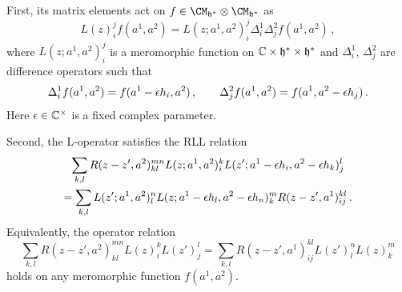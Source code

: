 First, its matrix elements act on
$f \in \CM_{\hf^*} \otimes \CM_{\hf^*}$ as
\begin{equation}
  L(z)^j_i f(a^1,a^2)
  = L(z;a^1,a^2)^j_i \Delta_i^1 \Delta_j^2 f(a^1,a^2) \,,
\end{equation}
where $L(z;a^1,a^2)^j_i$ is a meromorphic function on
$\mathbb{C} \times \mathfrak{h}^* \times \mathfrak{h}^*$ and $\Delta_i^1$,
$\Delta_j^2$ are difference operators such that
\begin{equation}
  \Delta_i^1 f(a^1,a^2)
  = f(a^1 - \epsilon h_i,a^2) \,,
  \qquad
  \Delta_j^2 f(a^1,a^2)
  = f(a^1, a^2 - \epsilon h_j) \,.
\end{equation}
Here $\epsilon\in\mathbb{C}^{\times}$ is a fixed complex parameter.

Second, the L-operator satisfies the RLL relation
\begin{multline}
  \label{eq:RLL}
  \sum_{k,l}
  R(z-z', a^2)^{mn}_{kl}
  L(z;a^1,a^2)^k_i
  L(z'; a^1 - \epsilon h_i, a^2 - \epsilon h_k)^l_j
  \\
  =
  \sum_{k,l}
  L(z';a^1,a^2)^n_l
  L(z; a^1 - \epsilon h_l, a^2 - \epsilon h_n)^m_k
  R(z-z', a^1)^{kl}_{ij} \,.
\end{multline}
Equivalently, the operator relation
\begin{equation}
  \sum_{k,l}
  R(z-z', a^2)^{mn}_{kl} L(z)^k_i L(z')^l_j
  =
  \sum_{k,l}
  R(z-z', a^1)^{kl}_{ij} L(z')^n_l L(z)^m_k
\end{equation}
holds on any meromorphic function $f(a^1, a^2)$.

